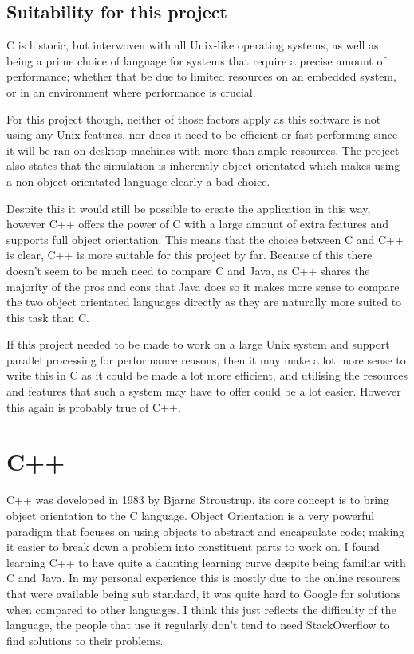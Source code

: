 \documentclass[10pt]{article}
\begin{document}
  \subsection{Suitability for this project}
  C is historic, but interwoven with all Unix-like operating systems, as well as being a prime choice of language for systems that require a precise amount of performance; whether that be due to limited resources on an embedded system, or in an environment where performance is crucial.

  For this project though, neither of those factors apply as this software is not using any Unix features, nor does it need to be efficient or fast performing since it will be ran on desktop machines with more than ample resources. The project also states that the simulation is inherently object orientated\cite{assignment1} which makes using a non object orientated language clearly a bad choice. 

  Despite this it would still be possible to create the application in this way, however C++ offers the power of C with a large amount of extra features and supports full object orientation. This means that the choice between C and C++ is clear, C++ is more suitable for this project by far. Because of this there doesn't seem to be much need to compare C and Java, as C++ shares the majority of the pros and cons that Java does so it makes more sense to compare the two object orientated languages directly as they are naturally more suited to this task than C. 

  If this project needed to be made to work on a large Unix system and support parallel processing for performance reasons, then it may make a lot more sense to write this in C as it could be made a lot more efficient, and utilising the resources and features that such a system may have to offer could be a lot easier. However this again is probably true of C++.

  \clearpage
  \section{C++}
  C++ was developed in 1983 by Bjarne Stroustrup, its core concept is to bring object orientation to the C language. Object Orientation is a very powerful paradigm that focuses on using objects to abstract and encapsulate code; making it easier to break down a problem into constituent parts to work on. I found learning C++ to have quite a daunting learning curve despite being familiar with C and Java. In my personal experience this is mostly due to the online resources that were available being sub standard, it was quite hard to Google for solutions when compared to other languages. I think this just reflects the difficulty of the language, the people that use it regularly don't tend to need StackOverflow to find solutions to their problems. 
\end{document}
